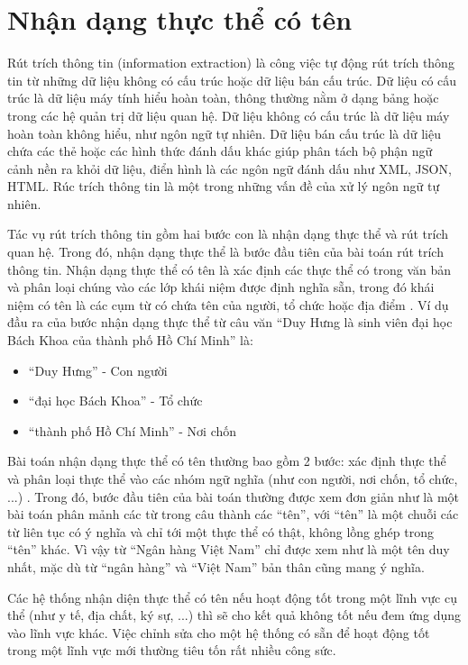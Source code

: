 \section{Nhận dạng thực thể có tên}
Rút trích thông tin (information extraction) là công việc tự động rút trích thông tin từ những dữ liệu không có cấu trúc hoặc dữ liệu bán cấu trúc. Dữ liệu có cấu trúc là dữ liệu máy tính hiểu hoàn toàn, thông thường nằm ở dạng bảng hoặc trong các hệ quản trị dữ liệu quan hệ. Dữ liệu không có cấu trúc là dữ liệu máy hoàn toàn không hiểu, như ngôn ngữ tự nhiên. Dữ liệu bán cấu trúc là dữ liệu chứa các thẻ hoặc các hình thức đánh dấu khác giúp phân tách bộ phận ngữ cảnh nền ra khỏi dữ liệu, điển hình là các ngôn ngữ đánh dấu như XML, JSON, HTML. Rúc trích thông tin là một trong những vấn đề của xử lý ngôn ngữ tự nhiên.

Tác vụ rút trích thông tin gồm hai bước con là nhận dạng thực thể và rút trích quan hệ. Trong đó, nhận dạng thực thể là bước đầu tiên của bài toán rút trích thông tin. Nhận dạng thực thể có tên là xác định các thực thể có trong văn bản và phân loại chúng vào các lớp khái niệm được định nghĩa sẵn, trong đó khái niệm có tên là các cụm từ có chứa tên của người, tổ chức hoặc địa điểm \cite{KimSang2003}. Ví dụ đầu ra của bước nhận dạng thực thể từ câu văn ``Duy Hưng là sinh viên đại học Bách Khoa của thành phố Hồ Chí Minh'' là:

\begin{itemize}
\item ``Duy Hưng'' - Con người
\item ``đại học Bách Khoa'' - Tổ chức
\item ``thành phố Hồ Chí Minh'' - Nơi chốn
\end{itemize}

Bài toán nhận dạng thực thể có tên thường bao gồm 2 bước: xác định thực thể và phân loại thực thể vào các nhóm ngữ nghĩa (như con người, nơi chốn, tổ chức, ...) \cite{KimSang2003}. Trong đó, bước đầu tiên của bài toán thường được xem đơn giản như là một bài toán phân mảnh các từ trong câu thành các ``tên'', với ``tên'' là một chuỗi các từ liên tục có ý nghĩa và chỉ tới một thực thể có thật, không lồng ghép trong ``tên'' khác. Vì vậy từ ``Ngân hàng Việt Nam'' chỉ được xem như là một tên duy nhất, mặc dù từ ``ngân hàng'' và ``Việt Nam'' bản thân cũng mang ý nghĩa.

Các hệ thống nhận diện thực thể có tên nếu hoạt động tốt trong một lĩnh vực cụ thể (như y tế, địa chất, ký sự, ...) thì sẽ cho kết quả không tốt nếu đem ứng dụng vào lĩnh vực khác. Việc chỉnh sửa cho một hệ thống có sẵn để hoạt động tốt trong một lĩnh vực mới thường tiêu tốn rất nhiều công sức.

